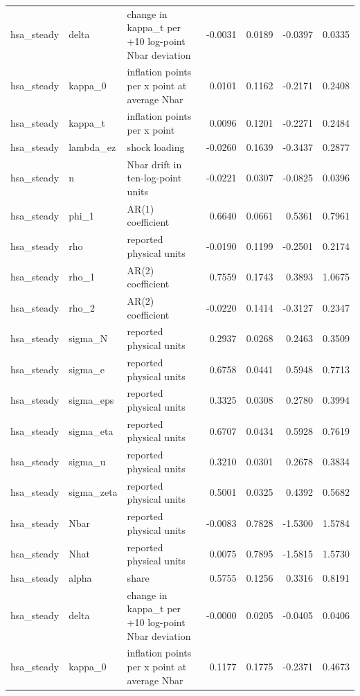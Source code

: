 \begin{tabular}{lllrrrr}
hsa\_steady & delta & change in kappa\_t per +10 log-point Nbar deviation & -0.0031 & 0.0189 & -0.0397 & 0.0335 \\
hsa\_steady & kappa\_0 & inflation points per x point at average Nbar & 0.0101 & 0.1162 & -0.2171 & 0.2408 \\
hsa\_steady & kappa\_t & inflation points per x point & 0.0096 & 0.1201 & -0.2271 & 0.2484 \\
hsa\_steady & lambda\_ez & shock loading & -0.0260 & 0.1639 & -0.3437 & 0.2877 \\
hsa\_steady & n & Nbar drift in ten-log-point units & -0.0221 & 0.0307 & -0.0825 & 0.0396 \\
hsa\_steady & phi\_1 & AR(1) coefficient & 0.6640 & 0.0661 & 0.5361 & 0.7961 \\
hsa\_steady & rho & reported physical units & -0.0190 & 0.1199 & -0.2501 & 0.2174 \\
hsa\_steady & rho\_1 & AR(2) coefficient & 0.7559 & 0.1743 & 0.3893 & 1.0675 \\
hsa\_steady & rho\_2 & AR(2) coefficient & -0.0220 & 0.1414 & -0.3127 & 0.2347 \\
hsa\_steady & sigma\_N & reported physical units & 0.2937 & 0.0268 & 0.2463 & 0.3509 \\
hsa\_steady & sigma\_e & reported physical units & 0.6758 & 0.0441 & 0.5948 & 0.7713 \\
hsa\_steady & sigma\_eps & reported physical units & 0.3325 & 0.0308 & 0.2780 & 0.3994 \\
hsa\_steady & sigma\_eta & reported physical units & 0.6707 & 0.0434 & 0.5928 & 0.7619 \\
hsa\_steady & sigma\_u & reported physical units & 0.3210 & 0.0301 & 0.2678 & 0.3834 \\
hsa\_steady & sigma\_zeta & reported physical units & 0.5001 & 0.0325 & 0.4392 & 0.5682 \\
hsa\_steady & Nbar & reported physical units & -0.0083 & 0.7828 & -1.5300 & 1.5784 \\
hsa\_steady & Nhat & reported physical units & 0.0075 & 0.7895 & -1.5815 & 1.5730 \\
hsa\_steady & alpha & share & 0.5755 & 0.1256 & 0.3316 & 0.8191 \\
hsa\_steady & delta & change in kappa\_t per +10 log-point Nbar deviation & -0.0000 & 0.0205 & -0.0405 & 0.0406 \\
hsa\_steady & kappa\_0 & inflation points per x point at average Nbar & 0.1177 & 0.1775 & -0.2371 & 0.4673 \\

\end{tabular}
